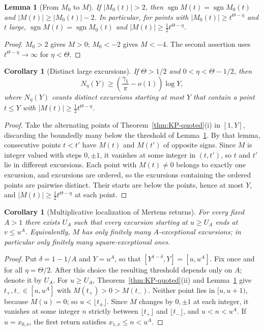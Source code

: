 \documentclass[11pt]{amsart}
\numberwithin{equation}{section}
\theoremstyle{plain}
\newtheorem{lemma}[theorem]{Lemma}
\newtheorem{corollary}[theorem]{Corollary}
\theoremstyle{definition}
\theoremstyle{remark}
\DeclareMathOperator{\sgn}{sgn}
\begin{document}
\begin{lemma}[From $M_0$ to $M$]
\label{lem:KP-translation}
If $|M_0(t)|>2$, then $\sgn M(t)=\sgn M_0(t)$ and
$|M(t)|\ge|M_0(t)|-2$. In particular, for points with
$|M_0(t)|\ge t^{\Theta-\eta}$ and $t$ large,
$\sgn M(t)=\sgn M_0(t)$ and $|M(t)|\ge\frac12t^{\Theta-\eta}$.
\end{lemma}

\begin{proof}
$M_0>2$ gives $M>0$; $M_0<-2$ gives $M<-4$. The second assertion uses
$t^{\Theta-\eta}\to\infty$ for $\eta<\Theta$.
\end{proof}

\begin{corollary}[Distinct large excursions]
\label{cor:KP-large-excursions}
If $\Theta>1/2$ and $0<\eta<\Theta-1/2$, then
\begin{equation}
\label{eq:KP-large-excursions}
N_\eta(Y)\ge\left(\frac{\gamma_1}{\pi}-o(1)\right)\log Y,
\end{equation}
where $N_\eta(Y)$ counts distinct excursions starting at most $Y$ that
contain a point $t\le Y$ with $|M(t)|\ge\tfrac12 t^{\Theta-\eta}$.
\end{corollary}

\begin{proof}
Take the alternating points of Theorem~\ref{thm:KP-quoted}(i) in $[1,Y]$,
discarding the boundedly many below the threshold of
Lemma~\ref{lem:KP-translation}. By that lemma, consecutive points $t<t'$
have $M(t)$ and $M(t')$ of opposite signs. Since $M$ is integer valued with
steps $0,\pm1$, it vanishes at some integer in $(t,t')$, so $t$ and $t'$ lie
in different excursions. Each point with $M(t)\ne0$ belongs to exactly one
excursion, and excursions are ordered, so the excursions containing the
ordered points are pairwise distinct. Their starts are below the points,
hence at most $Y$, and $|M(t)|\ge\frac12t^{\Theta-\eta}$ at each point.
\end{proof}

\begin{corollary}[Multiplicative localization of Mertens returns]
\label{cor:KP-local-returns}
For every fixed $A>1$ there exists $U_A$ such that every excursion starting
at $u\ge U_A$ ends at $v\le u^A$. Equivalently, $M$ has only finitely many
$A$-exceptional excursions; in particular only finitely many
square-exceptional ones.
\end{corollary}

\begin{proof}
Put $\delta=1-1/A$ and $Y=u^A$, so that
$[Y^{1-\delta},Y]=[u,u^A]$.  Fix once and for all
$\eta=\Theta/2$.  After this choice the resulting threshold depends only
on $A$; denote it by $U_A$.  For $u\ge U_A$,
Theorem~\ref{thm:KP-quoted}(ii) and Lemma~\ref{lem:KP-translation} give
$t_+,t_-\in[u,u^A]$ with $M(t_+)>0>M(t_-)$. Neither point lies in $[u,u+1)$,
because $M(u)=0$; so $u<\lfloor t_\pm\rfloor$. Since $M$ changes by
$0,\pm1$ at each integer, it vanishes at some integer $n$ strictly between
$\lfloor t_+\rfloor$ and $\lfloor t_-\rfloor$, and $u<n<u^A$. If
$u=x_{0,\nu}$, the first return satisfies $x_{1,\nu}\le n<u^A$.
\end{proof}
\end{document}
